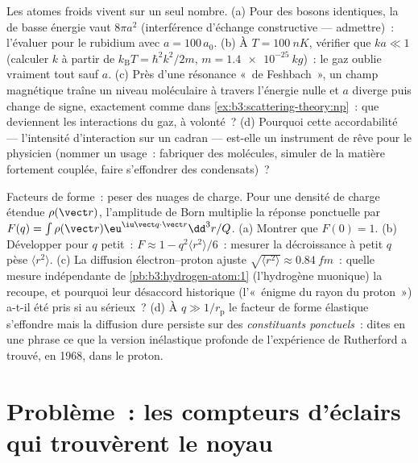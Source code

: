 \begin{exercise}[$\star\star\star$]\label{exo:b3:scattering-theory:11}
Les atomes froids vivent sur un seul nombre. (a) Pour des bosons
identiques, la  de basse énergie vaut $8\pi a^2$
(interférence d'échange constructive --- admettre)~: l'évaluer pour
le rubidium avec $a =
100\,a_0$. (b) À $T = \qty{100}{nK}$, vérifier que $ka \ll 1$
(calculer $k$ à partir de $k_{\text{B}}T = \hbar^2k^2/2m$, $m =
\qty{1.4e-25}{kg}$)~: le gaz oublie vraiment tout sauf $a$. (c)
Près d'une résonance «~de Feshbach~», un champ magnétique traîne un
niveau moléculaire à travers l'énergie nulle et $a$ diverge puis
change de signe, exactement comme dans
\cref{ex:b3:scattering-theory:np}~: que deviennent les interactions du
gaz, à volonté~? (d) Pourquoi cette accordabilité --- l'intensité
d'interaction sur un cadran --- est-elle un instrument de rêve pour le
physicien (nommer un usage~: fabriquer des molécules, simuler de la
matière fortement couplée, faire s'effondrer des condensats)~?
\end{exercise}

\begin{exercise}[$\star\star\star$]\label{exo:b3:scattering-theory:12}
Facteurs de forme~: peser des nuages de charge. Pour une densité de
charge étendue $\rho(\vect r)$, l'amplitude de Born multiplie la
réponse ponctuelle par $F(q) = \int\rho(\vect r)\eu^{\iu\vect q\cdot\vect r}
\dd^3r/Q$. (a) Montrer que $F(0) = 1$. (b) Développer pour $q$ petit~: $F
\approx 1 - q^2\langle r^2\rangle/6$~: mesurer la décroissance à
petit $q$ pèse $\langle r^2\rangle$. (c) La diffusion
électron--proton ajuste $\sqrt{\langle r^2\rangle} \approx \qty{0.84}{fm}$~:
quelle mesure indépendante de \cref{pb:b3:hydrogen-atom:1}
(l'hydrogène muonique) la recoupe, et pourquoi leur désaccord
historique (l'«~énigme du rayon du proton~») a-t-il été pris si au
sérieux~? (d) À $q \gg 1/r_{\text{p}}$ le facteur de forme élastique
s'effondre mais la diffusion dure persiste sur des \emph{constituants
ponctuels}~: dites en une phrase ce que la version inélastique
profonde de l'expérience de Rutherford a trouvé, en 1968, dans le
proton.
\end{exercise}

\section{Problème~: les compteurs d'éclairs qui trouvèrent le noyau}

